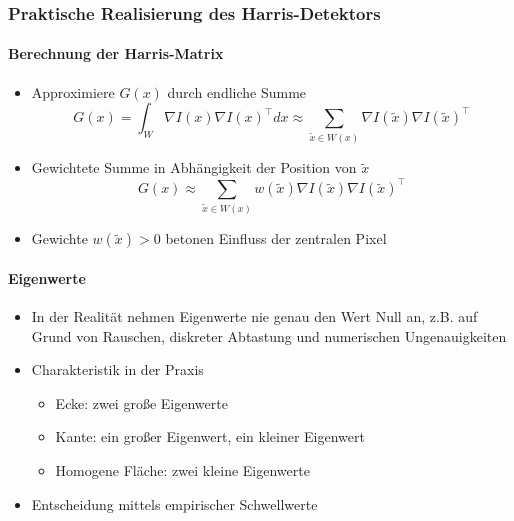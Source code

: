 \documentclass[12pt, a4paper, oneside]{article}
\begin{document}
\subsubsection{Praktische Realisierung des Harris-Detektors}
\paragraph*{Berechnung der Harris-Matrix}
\begin{itemize}
    \item Approximiere $G(x)$ durch endliche Summe
    $$
    G(x)=\int_W\nabla I(x)\nabla I(x)^\top dx\approx \sum\limits_{\tilde{x}\in W(x)}\nabla I(\tilde{x})\nabla I(\tilde{x})^\top
    $$
    \item Gewichtete Summe in Abhängigkeit der Position von $\tilde{x}$
    $$
    G(x)\approx \sum\limits_{\tilde{x}\in W(x)}w(\tilde{x})\nabla I(\tilde{x})\nabla I(\tilde{x})^\top
    $$
    \item Gewichte $w(\tilde{x})>0$ betonen Einfluss der zentralen Pixel
\end{itemize}
\paragraph*{Eigenwerte}
\begin{itemize}
    \item In der Realität nehmen Eigenwerte nie genau den Wert Null an, z.B. auf Grund von Rauschen, diskreter Abtastung und numerischen Ungenauigkeiten
    \item Charakteristik in der Praxis
    \begin{itemize}
        \item Ecke: zwei große Eigenwerte
        \item Kante: ein großer Eigenwert, ein kleiner Eigenwert
        \item Homogene Fläche: zwei kleine Eigenwerte
    \end{itemize}
    \item Entscheidung mittels empirischer Schwellwerte
\end{itemize}
\end{document}

